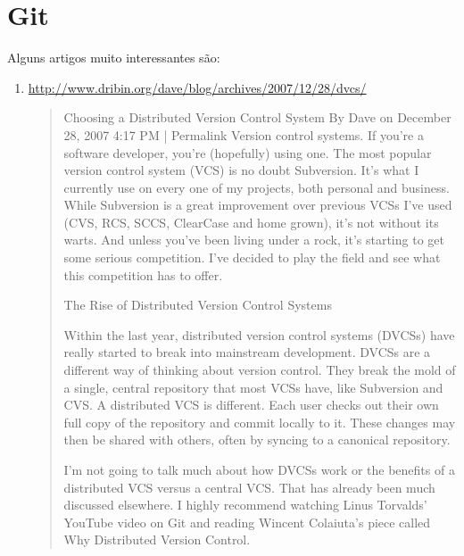 % 
% 
% 
% 
% 
\chapter{Git}
Alguns artigos muito interessantes s\~{a}o:
\begin{enumerate}
    \item \url{http://www.dribin.org/dave/blog/archives/2007/12/28/dvcs/}
        \begin{quote}
            Choosing a Distributed Version Control System
            By Dave on December 28, 2007 4:17 PM | Permalink
            Version control systems. If you’re a software developer, you’re (hopefully) using one. The most popular version control system (VCS) is no doubt Subversion. It’s what I currently use on every one of my projects, both personal and business. While Subversion is a great improvement over previous VCSs I’ve used (CVS, RCS, SCCS, ClearCase and home grown), it’s not without its warts. And unless you’ve been living under a rock, it’s starting to get some serious competition. I’ve decided to play the field and see what this competition has to offer.

            The Rise of Distributed Version Control Systems

            Within the last year, distributed version control systems (DVCSs) have really started to break into mainstream development. DVCSs are a different way of thinking about version control. They break the mold of a single, central repository that most VCSs have, like Subversion and CVS. A distributed VCS is different. Each user checks out their own full copy of the repository and commit locally to it. These changes may then be shared with others, often by syncing to a canonical repository.

            I’m not going to talk much about how DVCSs work or the benefits of a distributed VCS versus a central VCS. That has already been much discussed elsewhere. I highly recommend watching Linus Torvalds’ YouTube video on Git and reading Wincent Colaiuta’s piece called Why Distributed Version Control.


\end{quote}
\end{enumerate}
